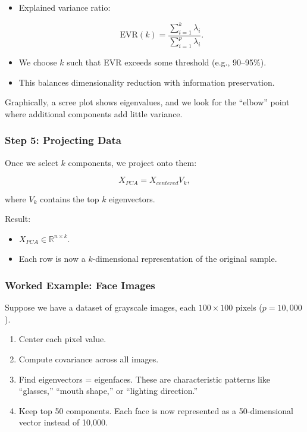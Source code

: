 \documentclass[
  letterpaper,
  DIV=11,
  numbers=noendperiod]{scrreprt}
\providecommand{\tightlist}{%
  \setlength{\itemsep}{0pt}\setlength{\parskip}{0pt}}
\begin{document}
\begin{itemize}
\item
  Explained variance ratio:

  \[
  \text{EVR}(k) = \frac{\sum_{i=1}^k \lambda_i}{\sum_{i=1}^p \lambda_i}.
  \]
\item
  We choose \(k\) such that EVR exceeds some threshold (e.g., 90--95\%).
\item
  This balances dimensionality reduction with information preservation.
\end{itemize}

Graphically, a scree plot shows eigenvalues, and we look for the
``elbow'' point where additional components add little variance.

\subsubsection{Step 5: Projecting Data}\label{step-5-projecting-data}

Once we select \(k\) components, we project onto them:

\[
X_{PCA} = X_{centered} V_k,
\]

where \(V_k\) contains the top \(k\) eigenvectors.

Result:

\begin{itemize}
\tightlist
\item
  \(X_{PCA} \in \mathbb{R}^{n \times k}\).
\item
  Each row is now a \(k\)-dimensional representation of the original
  sample.
\end{itemize}

\subsubsection{Worked Example: Face
Images}\label{worked-example-face-images}

Suppose we have a dataset of grayscale images, each \(100 \times 100\)
pixels (\(p = 10,000\)).

\begin{enumerate}
\def\labelenumi{\arabic{enumi}.}
\tightlist
\item
  Center each pixel value.
\item
  Compute covariance across all images.
\item
  Find eigenvectors = eigenfaces. These are characteristic patterns like
  ``glasses,'' ``mouth shape,'' or ``lighting direction.''
\item
  Keep top 50 components. Each face is now represented as a
  50-dimensional vector instead of 10,000.
\end{enumerate}
\end{document}
